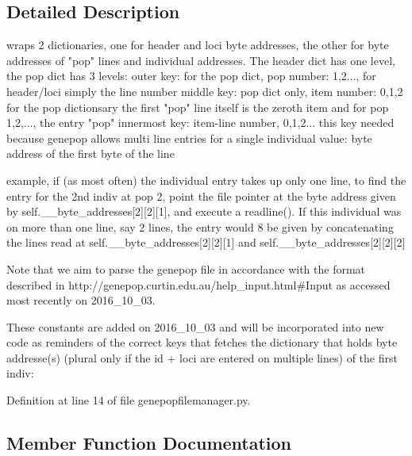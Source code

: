 \subsection{Detailed Description}
\begin{DoxyVerb}wraps 2 dictionaries, one for header and loci byte addresses, the other for 
        byte addresses of "pop" lines and individual addresses.  The header dict 
        has one level, the pop dict  has 3 levels:
        outer key: for the pop dict, pop number: 1,2..., for header/loci simply the line number
        middle key: pop dict only,   item number: 0,1,2
            for the pop dictionsary the first "pop" line itself is the zeroth item
            and for pop 1,2,..., the entry "pop"
        innermost key:  item-line number, 0,1,2...
            this key needed because genepop allows multi line entries for
            a single individual
    value: byte address of the first byte of the line

    example, if (as most often) the individual entry takes up only one line, 
    to find the entry for the 2nd indiv at pop 2, point the file pointer at 
    the byte address given by self.__byte_addresses[2][2][1], and execute a readline().  
    If this individual was on more than one line, say 2 lines, the entry would 8
    be given by concatenating the lines read at self.__byte_addresses[2][2][1] 
    and self.__byte_addresses[2][2][2]

    Note that we aim to parse the genepop file in accordance with the format described
    in http://genepop.curtin.edu.au/help_input.html#Input as accessed most recently
    on 2016_10_03.
\end{DoxyVerb}
\begin{DoxyVerb}These constants are added on 2016_10_03
and will be incorporated into new code
as reminders of the correct keys that
fetches the dictionary that holds byte addresse(s) 
(plural only if the id + loci are entered
on multiple lines) of the first indiv:
\end{DoxyVerb}
 

Definition at line 14 of file genepopfilemanager.\+py.



\subsection{Member Function Documentation}
